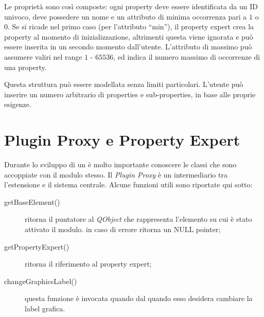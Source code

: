 Le proprietà sono così composte: ogni property deve essere identificata da un ID univoco, deve possedere un nome e un attributo di minima occorrenza pari a $1$ o $0$. Se si ricade nel primo caso (per l'attributo ``min''), il property expert crea la property al momento di inizializzazione, altrimenti questa viene ignorata e può essere inserita in un secondo momento dall'utente.
L'attributo di massimo può assumere valiri nel range $1$ - $65536$, ed indica il numero massimo di occorrenze di una property.

Questa struttura può essere modellata senza limiti particolari. L'utente può inserire un numero arbitrario di properties e sub-properties, in base alle proprie esigenze.

\section*{Plugin Proxy e Property Expert}
Durante lo sviluppo di un \plugin{} è molto importante conoscere le classi che sono accoppiate con il modulo stesso. Il \emph{Plugin Proxy} è un intermediario tra l'estensione e il sistema centrale. Alcune funzioni utili sono riportate qui sotto:
\begin{description}
\item[getBaseElement()] ritorna il puntatore al \emph{QObject} che rappresenta l'elemento su cui è stato attivato il modulo. in caso di errore ritorna un NULL pointer;

\item[getPropertyExpert()] ritorna il riferimento al property expert;

\item[changeGraphicsLabel()] questa funzione è invocata quando dal \plugin{} quando esso desidera cambiare la label grafica. 
\end{description}

